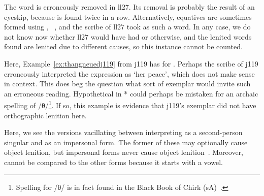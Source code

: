 \begin{mwl}
\end{mwl}
The word  is erroneously removed in \gls{ll27}. Its removal is probably the result of an eyeskip, because  is found twice in a row. Alternatively, equatives are sometimes formed using , \eg {}~\autocite[\S 41]{evans_grammar_1964}, and the scribe of \gls{ll27} took  as such a word.  In any case, we do not know now whether \gls{ll27} would have had  or  otherwise, and the lenited words found are lenited due to different causes, so this instance cannot be counted.

\begin{mwl}
\end{mwl}
Here, Example~\ref{ex:thangneuedj119} from \gls{j119} has  for . Perhaps the scribe of \gls{j119} erroneously interpreted the expression as `her peace', which does not make sense in context. This does beg the question what sort of exemplar would invite such an erroneous reading. Hypothetical  in * could perhaps be mistaken for an archaic spelling of /θ/\footnote{Spelling  for /θ/ is in fact found in the Black Book of Chirk (\gls{sA})~\autocite[147]{Rus_Scribal95}.}. If so, this example is evidence that \gls{j119}'s exemplar did not have orthographic lenition here.

\begin{mwl}
\end{mwl}
Here, we see the versions vacillating between interpreting  as a second-person singular and as an impersonal form. The former of these may optionally cause object lenition, but impersonal forms never cause object lenition~\autocite[67]{van_development14}. Moreover,  cannot be compared to the other forms because it starts with a vowel.


